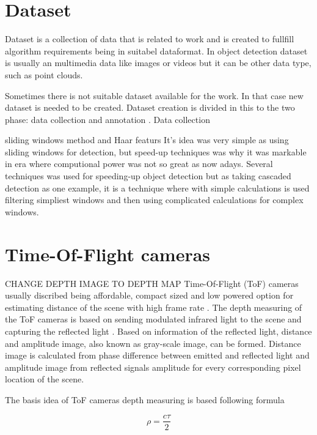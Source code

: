 \section{Dataset}
Dataset is a collection of data that is related to work and is created to fullfill algorithm requirements being in suitabel dataformat.
In object detection dataset is usually an multimedia data like images or videos but it can be other data type,
such as point clouds. \cite{object_detection_review}

Sometimes there is not suitable dataset available for the work. In that case new dataset is needed to be created. Dataset creation is divided in this to the two phase:
data collection and annotation \cite{object_detection_review}.
Data collection



sliding windows method and Haar featurs
It's idea was very simple as using sliding windows for detection, but speed-up techniques was why it was markable in era where computional power was not so great as now adays. Several techniques was used for speeding-up object detection but as taking cascaded detection as one example, it is a technique where with simple calculations is used filtering simpliest windows and then using complicated calculations for complex windows. \cite{object_detection_20years}


\section{Time-Of-Flight cameras}
CHANGE DEPTH IMAGE TO DEPTH MAP
Time-Of-Flight (ToF) cameras usually discribed being affordable, compact sized and low powered option for estimating distance of the scene with high frame rate\cite{TI2019} \cite{indepth}.
The depth measuring of the ToF cameras is based on sending modulated infrared light to the scene and capturing
the reflected light \cite{inproceedings}\cite{tof}\cite{vizta}. Based on information of the reflected light,
distance and amplitude image, also known as gray-scale image, can be formed. Distance image is calculated from phase difference between emitted
and reflected light and amplitude image from reflected signals amplitude for every corresponding pixel location of the scene. \cite{InfineonReal3} \cite{inproceedings}

The basis idea of ToF cameras depth measuring is based following formula

\begin{equation}
    \rho = \frac{c\tau}{2}
\end{equation}

